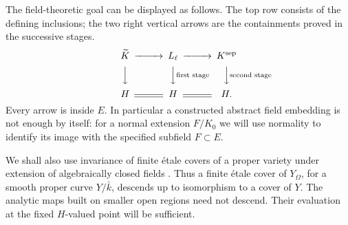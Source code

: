 The field-theoretic goal can be displayed as follows. The top row consists
of the defining inclusions; the two right vertical arrows are the
containments proved in the successive stages.
\[
\begin{CD}
 \widetilde K @>>> L_\ell @>>> K^{\mathrm{sep}}\\
 @VVV @VV{\text{first stage}}V @VV{\text{second stage}}V\\
 H @= H @= H .
\end{CD}
\]
Every arrow is inside $E$. In particular a constructed abstract field
embedding is not enough by itself: for a normal extension $F/K_0$ we
will use normality to identify its image with the specified subfield
$F\subset E$.

We shall also use invariance of finite \'etale covers of a proper variety
under extension of algebraically closed fields
\cite[Expos\'e~X, Corollary~1.8]{SGA1}. Thus a finite \'etale cover of
$Y_\Omega$, for a smooth proper curve $Y/\bar k$, descends up to
isomorphism to a cover of $Y$. The analytic maps built on smaller open
regions need not descend. Their evaluation at the fixed $H$-valued point
will be sufficient.
